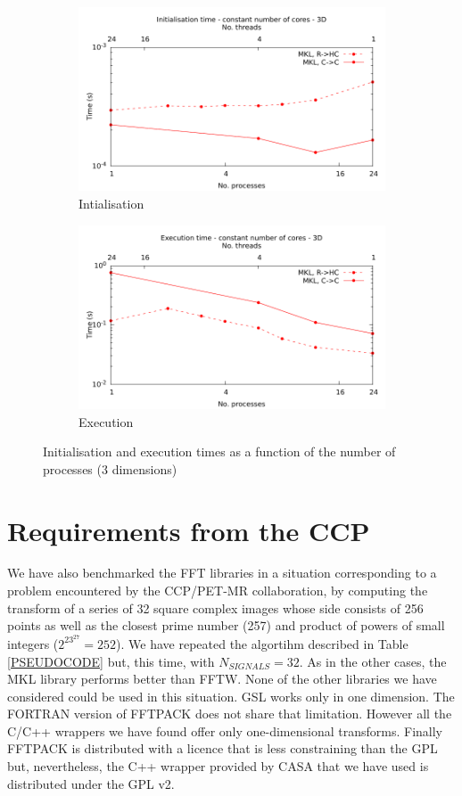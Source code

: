 \documentclass[12pt, a4paper]{article}
\begin{document}
\begin{figure}[H]
\captionsetup{width=0.8\linewidth}
\centering
\begin{subfigure}{.5\textwidth}
\centering
\includegraphics[width=.9\linewidth]{graphs/const-init-3d.pdf}
\caption{Intialisation}
\label{3DCONSTI}
\end{subfigure}%
\begin{subfigure}{.5\textwidth}
\centering
\includegraphics[width=.9\linewidth]{graphs/const-exec-3d.pdf}
\caption{Execution}
\label{3DCONSTE}
\end{subfigure}
\caption{Initialisation and execution times as a function of the number of processes (3 dimensions)}
\label{3DCONST}
\end{figure}


\section{Requirements from the CCP}\label{CCPPETMR}
We have also benchmarked the FFT libraries in a situation corresponding to a problem encountered by the CCP/PET-MR collaboration, by computing the transform of a series of 32 square complex images whose side consists of 256 points as well as the closest prime number (257) and product of powers of small integers ($2^23^27=252$). We have repeated the algortihm described in Table \ref{PSEUDOCODE} but, this time, with $N_{SIGNALS}=32$. As in the other cases, the MKL library performs better than FFTW. None of the other libraries we have considered could be used in this situation. GSL works only in one dimension. The FORTRAN version of FFTPACK does not share that limitation. However all the C/C++ wrappers we have found offer only one-dimensional transforms. Finally FFTPACK is distributed with a licence that is less constraining than the GPL but, nevertheless, the C++ wrapper provided by CASA that we have used is distributed under the GPL v2.
\end{document}
